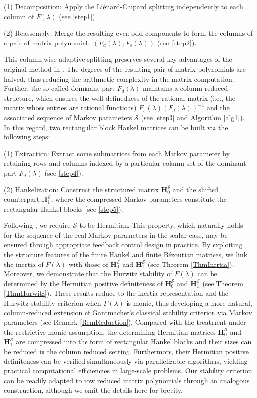 \documentclass[12pt,reqno]{amsart}
\theoremstyle{plain}
\numberwithin{equation}{section}
\theoremstyle{remark}
\begin{document}
(1) Decomposition: Apply the Li\'{e}nard-Chipard splitting independently to each column of 
$F(\lambda)$ (see \ref{step1}).

(2) Reassembly: Merge the resulting even-odd components to form the columns of a pair of matrix polynomials $(F_d(\lambda), F_s(\lambda))$  (see~\ref{step2}).

This column-wise adaptive splitting preserves several key advantages of the original method in \cite{XD}. The degrees of the resulting pair of matrix polynomials are  halved, thus reducing the arithmetic complexity in the matrix computation.
Further, the so-called dominant part $F_d(\lambda)$ maintains a column-reduced structure, which ensures the well-definedness of the rational matrix (i.e., the matrix whose
entries are rational functions) $F_s(\lambda)(F_d(\lambda))^{-1}$ and the associated sequence of Markov parameters $\mathscr S$ (see \ref{step3} and Algorithm \ref{alg1}).
In this regard,
two rectangular block Hankel matrices can be built
via the following steps:

(1) Extraction: Extract some submatrices from each Markov parameter by retaining rows and columns indexed by a particular column set of the dominant part $F_d(\lambda)$ (see \ref{step4}).

(2) Hankelization: Construct the structured matrix $\mathbf{H}_{0}^{\mathscr S}$ and the shifted counterpart $\mathbf{H}_{1}^{\mathscr S}$, where the compressed Markov parameters constitute the rectangular Hankel blocks (see \ref{step5}).  

Following \cite{XD}, we require $\mathscr S$ to be Hermitian. This property, which naturally holds for the sequence of the real Markov parameters in the scalar case, may be ensured through appropriate feedback control design in practice.
By exploiting the structure features of the finite Hankel and finite B\'ezoutian matrices, we link the inertia of $F(\lambda)$ with those of $\mathbf{H}_{0}^{\mathscr S}$ and $\mathbf{H}_{1}^{\mathscr S}$ (see Theorem \ref{ThmInertia}). 
Moreover, we demonstrate that the Hurwitz stability of $F(\lambda)$ can be determined by the Hermitian positive definiteness of $\mathbf{H}_{0}^{\mathscr S}$ and $\mathbf{H}_{1}^{\mathscr S}$ (see Theorem \ref{ThmHurwitz}). These results reduce to the inertia representation  \cite[Theorem 3.5]{XD} and the Hurwitz stability criterion \cite[Theorem 4.4]{XD} when $F(\lambda)$ is monic, thus developing a more natural, column-reduced extension of Gantmacher's classical stability criterion via Markov parameters (see Remark \ref{RemReduction}). 
Compared with the treatment \cite{XD} under the restrictive monic assumption, the determining  Hermitian  matrices $\mathbf{H}_{0}^{\mathscr S}$ and  $\mathbf{H}_{1}^{\mathscr S}$ are compressed into the form of rectangular Hankel blocks and their sizes can be reduced in the column reduced setting. 
Furthermore, their Hermitian positive definiteness can be verified simultaneously via parallelizable algorithms, yielding practical computational efficiencies in large-scale problems. Our stability criterion can be readily adapted to row reduced matrix polynomials through an analogous construction, although we omit the details here for brevity.
 
\end{document}
